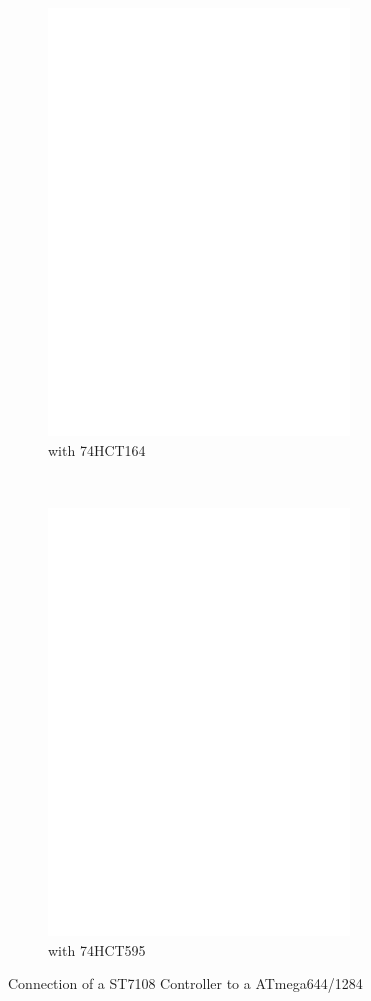 \begin{figure}[H]
  \begin{subfigure}[b]{9cm}
    \centering
    \includegraphics[width=8cm]{../FIG/ST7108serial164_644.eps}
    \caption{with 74HCT164}
  \end{subfigure}
  ~
  \begin{subfigure}[b]{9cm}
    \centering
    \includegraphics[width=8cm]{../FIG/ST7108serial595_644.eps}
    \caption{with 74HCT595}
  \end{subfigure}
  \caption{Connection of a ST7108 Controller to a ATmega644/1284}
  \label{fig:ST7108lcd_644}
\end{figure}


